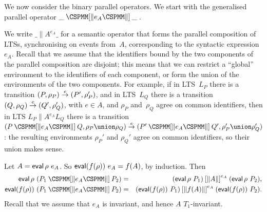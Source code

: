 We now consider the binary parallel operators.  We start with the generalised
parallel operator $\_ \synPar{e_A}  \_$\,.  

We write $\_ \parallel{A}^{e_A} \_$ for a semantic operator that forms the
parallel composition of LTSs, synchronising on events from~$A$, corresponding
to the syntactic expression~$e_A$.  Recall that we assume that the identifiers
bound by the two components of the parallel composition are disjoint; this
means that we can restrict a ``global'' environment to the identifiers of each
component, or form the union of the environments of the two components.  For
example, if in LTS~$L_P$ there is a transition $(P, \rho_P) \stackrel{e}{\rightarrow}
(P', \rho_P')$, and in LTS~$L_Q$ there is a transition $(Q, \rho_Q) \stackrel{e}{\rightarrow}
(Q', \rho_Q')$, with $e \in A$, and $\rho_P$ and~$\rho_Q$ agree on common
identifiers, then in LTS $L_P \parallel{A}^{e_A} L_Q$ there is a transition
$(P \synPar{e_A} Q, \rho_P \union \rho_Q) \trans{e} (P'
\synPar{e_A} Q', \rho_P' \union \rho_Q')$: the resulting environments
$\rho_P'$ and $\rho_Q'$ agree on common identifiers, so their union makes
sense.

Let $A = \mathop{\sf eval} \rho~e_A$.  So $\mathop{\sf eval} (f(\rho))~e_A = f(A)$, by induction.
Then
\begin{eqnarray*}
\eval \rho~ (P_1 \synPar{e_A} P_2) & = & 
  (\eval \rho~ P_1) \parallel{A}^{e_A} (\eval \rho~ P_2) , \\
\eval (f(\rho)) ~ (P_1 \synPar{e_A} P_2) & = & 
  (\eval (f(\rho))~ P_1) \parallel{f(A)}^{e_A} (\eval (f(\rho))~ P_2).
\end{eqnarray*}
%
Recall that we assume that $e_A$ is invariant, and hence $A$ $T_1$-invariant.

